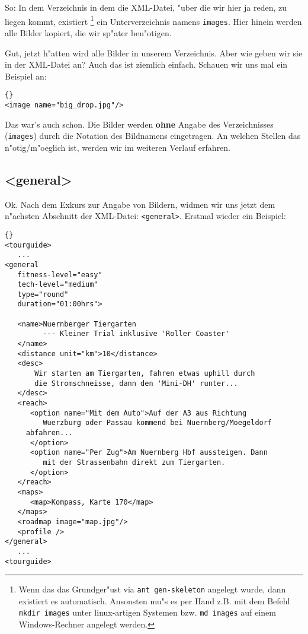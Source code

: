 So: In dem Verzeichnis in dem die XML-Datei, "uber die wir
hier ja reden, zu liegen kommt, existiert \footnote{Wenn das
das Grundger"ust via \texttt{ant gen-skeleton} angelegt wurde,
dann existiert es automatisch. Ansonsten mu"s es per Hand
z.B. mit dem Befehl \texttt{mkdir images} unter linux-artigen
Systemen bzw. \texttt{md images} auf einem Windows-Rechner
angelegt werden.} ein Unterverzeichnis namens \texttt{images}.
Hier hinein werden alle Bilder kopiert, die wir sp"ater
ben"otigen.

Gut, jetzt h"atten wird alle Bilder in unserem Verzeichnis.
Aber wie geben wir sie in der XML-Datei an? Auch das ist
ziemlich einfach. Schauen wir uns mal ein Beispiel an:
\lstset{numbers=left,numberstyle=\tiny,stepnumber=1}

\lstset{numbers=left,numberstyle=\tiny,stepnumber=1}
\begin{lstlisting}{}
<image name="big_drop.jpg"/>
\end{lstlisting}

Das war's auch schon. Die Bilder werden \textbf{ohne} Angabe
des Verzeichnisses (\texttt{images}) durch die Notation des 
Bildnamens eingetragen. An welchen Stellen das n"otig/m"oeglich
ist, werden wir im weiteren Verlauf erfahren.

\subsection{<general>}
Ok. Nach dem Exkurs zur Angabe von Bildern, widmen wir uns
jetzt dem n"achsten Abschnitt der XML-Datei: \texttt{<general>}.
Erstmal wieder ein Beispiel:

\lstset{numbers=left,numberstyle=\tiny,stepnumber=1}
\begin{lstlisting}{}
<tourguide>
   ...
<general 
   fitness-level="easy" 
   tech-level="medium" 
   type="round" 
   duration="01:00hrs">
   
   <name>Nuernberger Tiergarten 
         --- Kleiner Trial inklusive 'Roller Coaster'
   </name>
   <distance unit="km">10</distance>
   <desc>
       Wir starten am Tiergarten, fahren etwas uphill durch 
       die Stromschneisse, dann den 'Mini-DH' runter...
   </desc>
   <reach>
      <option name="Mit dem Auto">Auf der A3 aus Richtung 
         Wuerzburg oder Passau kommend bei Nuernberg/Moegeldorf 
	 abfahren...
      </option>
      <option name="Per Zug">Am Nuernberg Hbf aussteigen. Dann 
         mit der Strassenbahn direkt zum Tiergarten.
      </option>
   </reach>
   <maps>
      <map>Kompass, Karte 170</map>
   </maps>
   <roadmap image="map.jpg"/>
   <profile />
</general>   
   ...
<tourguide>
\end{lstlisting}

